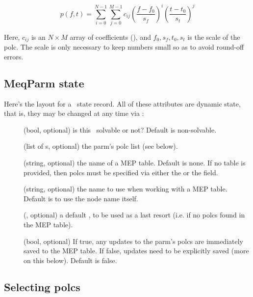   \begin{equation}
  p(f,t) = \sum_{i=0}^{N-1}\sum_{j=0}^{M-1} c_{ij}(\frac{f-f_0}{s_f})^i(\frac{t-t_0}{s_t})^j
  \end{equation}
  
  Here, $c_{ij}$ is an $N\times M$ array of coefficients (), and
  $f_0,s_f,t_0,s_t$ is the scale of the polc. The scale is only necessary to
  keep numbers small so as to avoid round-off errors.

\subsection{MeqParm state}

  Here's the layout for a \Parm\ state record. All of these attributes are
  dynamic state, that is, they may be changed at any time via :
  
  \begin{description}

  \item[] (bool, optional) is this \Parm\ solvable or not?
    Default is non-solvable.

  \item[] (list of \Polc{}s, optional) the parm's polc list (see below).

  \item[] (string, optional) the name of a MEP table. Default is none.
    If no table is provided, then polcs must be specified via either the
     or the  field.

  \item[] (string, optional) the name to use when working with a MEP
    table. Default is to use the node name itself.

  \item[] (\Polc, optional) a default \Polc, to be used as a last
    resort (i.e. if no polcs found in the MEP table).

  \item[] (bool, optional) If true, any updates to the parm's 
    polcs are immediately saved to the MEP table. If false, updates need to be
    explicitly saved (more on this below). Default is false.

  \end{description}
  
\subsection{Selecting polcs}

